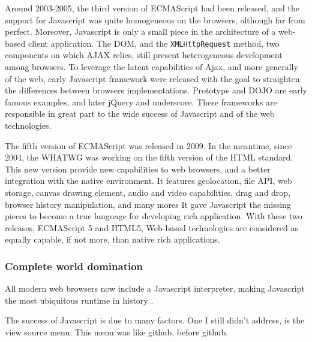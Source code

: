Around 2003-2005, the third version of ECMAScript had been released, and the support for Javascript was quite homogeneous on the browsers, although far from perfect.
Moreover, Javascript is only a small piece in the architecture of a web-based client application.
The DOM, and the \texttt{XMLHttpRequest} method, two components on which AJAX relies, still present heterogeneous development among browsers.
To leverage the latent capabilities of Ajax, and more generally of the web, early Javascript framework were released with the goal to straighten the differences between browsers implementations.
Prototype and DOJO are early famous examples, and later jQuery and underscore.
These frameworks are responsible in great part to the wide success of Javascript and of the web technologies.

The fifth version of ECMAScript was released in 2009.
In the meantime, since 2004, the WHATWG was working on the fifth version of the HTML standard.
This new version provide new capabilities to web browsers, and a better integration with the native environment.
It features geolocation, file API, web storage, canvas drawing element, audio and video capabilities, drag and drop, browser history manipulation, and many mores
It gave Javascript the missing pieces to become a true language for developing rich application.
With these two releases, ECMAScript 5 and HTML5, Web-based technologies are considered as equally capable, if not more, than native rich applications.

\subsubsection{Complete world domination}


All modern web browsers now include a Javascript interpreter, making Javascript the most ubiquitous runtime in history \cite{Flanagan2006}.

The success of Javascript is due to many factors.
One I still didn't address, is the view source menu.
This menu was like github, before github.

